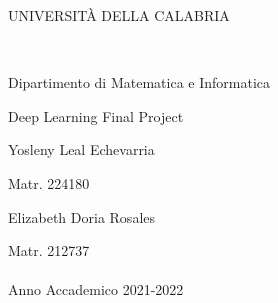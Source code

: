 \documentclass[a4paper, 10pt]{report}
\begin{document}
\begin{titlepage}

\vspace{-3.5cm}
\centerline{\huge{UNIVERSIT\`A DELLA CALABRIA}}
\hrulefill\\

\vspace{2cm}
\centerline{\Large{Dipartimento di Matematica e Informatica}}
\vspace{1.5cm}


\vspace{1.5cm}
\begin{center}
\huge{Deep Learning Final Project}\\
\end{center}

\vspace{6cm}


\raggedright\large{Yosleny Leal Echevarria}\\                              
\raggedright\large {Matr. 224180}\\ 

\vspace{1cm} 

\raggedright\large{Elizabeth Doria Rosales}\\                              
\raggedright\large {Matr. 212737}\\       

\vspace{2 cm}
\hrulefill\\
\centering\large{Anno Accademico 2021-2022}

\end{titlepage}

\tableofcontents





\end{document}
